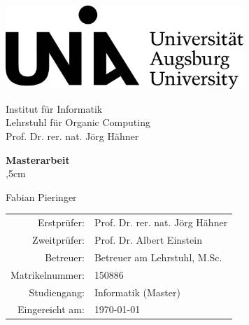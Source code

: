 \begin{titlepage}
\begin{large}
\begin{center}
\includegraphics[width=9cm]{uni-augsburg-logo.jpg}

Institut f\"ur Informatik\\
Lehrstuhl f\"ur Organic Computing\\
Prof. Dr. rer. nat. J\"org H\"ahner\\
\vskip 2cm



\textbf{\Large Masterarbeit}\\
,5cm
{\LARGE\bfseries\textsf \titel \par}
\vfill

{\huge Fabian Pieringer}\\
\vfill


\end{center}
\vfill
\newpage
\thispagestyle{empty}
\begin{tabular}{rl}
Erstpr\"ufer: & Prof. Dr. rer. nat. J\"org H\"ahner\\
Zweitpr\"ufer: & Prof. Dr. Albert Einstein\\
Betreuer: & Betreuer am Lehrstuhl, M.Sc.\\
Matrikelnummer: & 150886\\
Studiengang: & Informatik (Master)\\
Eingereicht am: & \today\\
\end{tabular}
\end{large}
\end{titlepage}